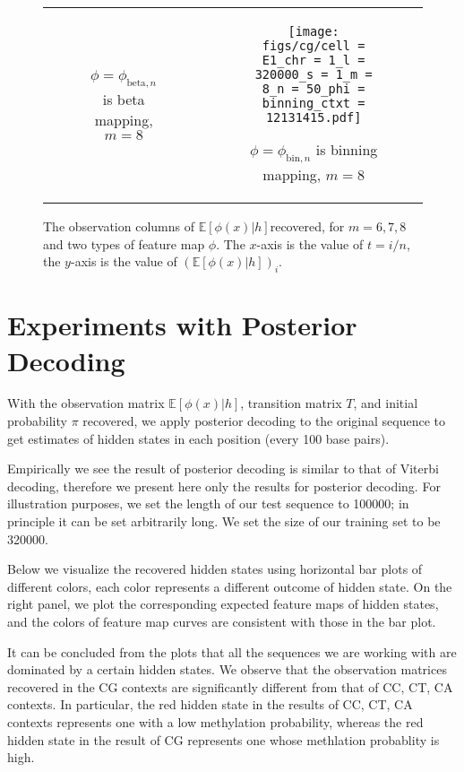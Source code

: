 \documentclass{article}
\def\E{\mathbb{E}}
\def\bin{\text{bin}}
\def\bet{\text{beta}}
\begin{document}
\begin{figure}[H]
\begin{tabular}{cc}
\begin{subfigure}[t]{0.4\textwidth}
        \caption{$\phi = \phi_{\bet, n}$ is beta mapping, $m = 8$}
    \end{subfigure}
    &
    \begin{subfigure}[t]{0.4\textwidth}
        \texttt{[image: figs/cg/cell = E1\_chr = 1\_l = 320000\_s = 1\_m = 8\_n = 50\_phi = binning\_ctxt = 12131415.pdf]}
        \caption{$\phi = \phi_{\bin, n}$ is binning mapping, $m = 8$}
    \end{subfigure}
    \end{tabular}
    \caption{The observation columns of $\E[\phi(x)|h]$recovered, for $m = 6,7,8$ and two types of feature map $\phi$. The $x$-axis is the value of $t = i/n$, the $y$-axis is the value of $(\E[\phi(x)|h])_i$.}
    \label{fig:varyphicg2}
\end{figure}


\section{Experiments with Posterior Decoding}

With the observation matrix $\E[\phi(x)|h]$, transition matrix $T$, and initial probability $\pi$ recovered,
we apply posterior decoding to the original sequence to get estimates of hidden states in each position (every 100 base pairs).

Empirically we see the result of posterior decoding is similar to that of Viterbi decoding, therefore we present here only the results
for posterior decoding. For illustration purposes, we set the length of our test sequence to 100000; in principle it can be set arbitrarily long.
We set the size of our training set to be 320000.

Below we visualize the recovered hidden states using horizontal bar plots of different colors, each color represents a different outcome
of hidden state. On the right panel, we plot the corresponding expected feature maps of hidden states, and the colors of feature map
curves are consistent with those in the bar plot.

It can be concluded from the plots that all the sequences we are working with are dominated by a certain hidden states. We observe that the
observation matrices recovered in the CG contexts are significantly different from that of CC, CT, CA contexts. In particular, the red hidden
state in the results of CC, CT, CA contexts represents one with a low methylation probability, whereas the red hidden state in the result of CG
represents one whose methlation probablity is high.
\end{document}
